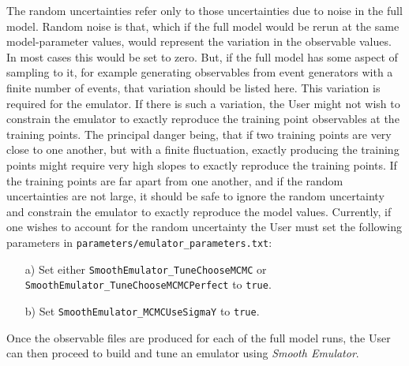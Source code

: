 \documentclass[UserManual.tex]{subfiles}
\begin{document}
The random uncertainties refer only to those uncertainties due to noise in the full model. Random noise is that, which if the full model would be rerun at the same model-parameter values, would represent the variation in the observable values. In most cases this would be set to zero. But, if the full model has some aspect of sampling to it, for example generating observables from event generators with a finite number of events, that variation should be listed here. This variation is required for the emulator. If there is such a variation, the User might not wish to constrain the emulator to exactly reproduce the training point observables at the training points. The principal danger being, that if two training points are very close to one another, but with a finite fluctuation, exactly producing the training points might require very high slopes to exactly reproduce the training points. If the training points are far apart from one another, and if the random uncertainties are not large, it should be safe to ignore the random uncertainty and constrain the emulator to exactly reproduce the model values. Currently, if one wishes to account for the random uncertainty the User must set the following parameters in {\tt parameters/emulator\_parameters.txt}:
\begin{itemize}\itemsep=0pt
\item [a)] Set either {\tt SmoothEmulator\_TuneChooseMCMC} or {\tt SmoothEmulator\_TuneChooseMCMCPerfect} to {\tt true}. 
\item [b)] Set {\tt SmoothEmulator\_MCMCUseSigmaY} to {\tt true}.
\end{itemize}

Once the observable files are produced for each of the full model runs, the User can then proceed to build and tune an emulator using {\it Smooth Emulator}.
\end{document}
